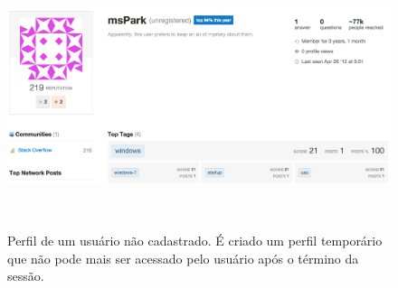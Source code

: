 \begin{figure}[!b]
  \includegraphics[width=1\columnwidth]{figures/user3.png}
  \caption[Perfil de um usuário não cadastrado]{Perfil de um usuário não cadastrado. É criado um perfil temporário que não pode mais ser acessado pelo usuário após o término da sessão.}~\label{fig:user-not-reg}
\end{figure}









